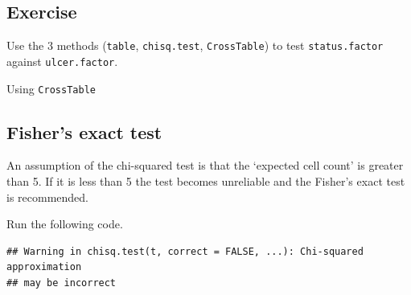 \documentclass[]{book}
\makeatletter
\newenvironment{Shaded}{\begin{snugshade}}{\end{snugshade}}
\newcommand{\KeywordTok}[1]{\textcolor[rgb]{0.13,0.29,0.53}{\textbf{#1}}}
\newcommand{\DataTypeTok}[1]{\textcolor[rgb]{0.13,0.29,0.53}{#1}}
\newcommand{\OtherTok}[1]{\textcolor[rgb]{0.56,0.35,0.01}{#1}}
\newcommand{\OperatorTok}[1]{\textcolor[rgb]{0.81,0.36,0.00}{\textbf{#1}}}
\newcommand{\NormalTok}[1]{#1}
\newenvironment{kframe}{%
\medskip{}
\setlength{\fboxsep}{.8em}
 \def\at@end@of@kframe{}%
 \ifinner\ifhmode%
  \def\at@end@of@kframe{\end{minipage}}%
  \begin{minipage}{\columnwidth}%
 \fi\fi%
 \def\FrameCommand##1{\hskip\@totalleftmargin \hskip-\fboxsep
 \colorbox{shadecolor}{##1}\hskip-\fboxsep
     \hskip-\linewidth \hskip-\@totalleftmargin \hskip\columnwidth}%
 \MakeFramed {\advance\hsize-\width
   \@totalleftmargin\z@ \linewidth\hsize
   \@setminipage}}%
 {\par\unskip\endMakeFramed%
 \at@end@of@kframe}
\renewenvironment{Shaded}{\begin{kframe}}{\end{kframe}}
\makeatother
\begin{document}
\subsection{Exercise}\label{exercise-41}

Use the 3 methods (\texttt{table}, \texttt{chisq.test},
\texttt{CrossTable}) to test \texttt{status.factor} against
\texttt{ulcer.factor}.

\begin{Shaded}
\end{Shaded}

Using \texttt{CrossTable}

\begin{Shaded}
\end{Shaded}

\subsection{Fisher's exact test}\label{fishers-exact-test}

An assumption of the chi-squared test is that the `expected cell count'
is greater than 5. If it is less than 5 the test becomes unreliable and
the Fisher's exact test is recommended.

Run the following code.

\begin{Shaded}
\end{Shaded}

\begin{verbatim}
## Warning in chisq.test(t, correct = FALSE, ...): Chi-squared approximation
## may be incorrect
\end{verbatim}
\end{document}
